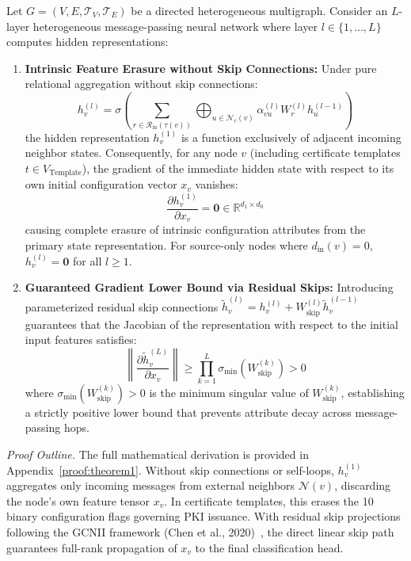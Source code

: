 \begin{theorem}
\label{thm:representation_preservation}
Let $G = (V, E, \mathcal{T}_V, \mathcal{T}_E)$ be a directed heterogeneous multigraph. Consider an $L$-layer heterogeneous message-passing neural network where layer $l \in \{1, \dots, L\}$ computes hidden representations:
\begin{enumerate}
    \item \textbf{Intrinsic Feature Erasure without Skip Connections:} Under pure relational aggregation without skip connections:
    \begin{equation}
    h_v^{(l)} = \sigma \left( \sum_{r \in \mathcal{R}_{\text{in}}(\tau(v))} \bigoplus_{u \in \mathcal{N}_r(v)} \alpha_{vu}^{(l)} W_r^{(l)} h_u^{(l-1)} \right)
    \end{equation}
    the hidden representation $h_v^{(1)}$ is a function exclusively of adjacent incoming neighbor states. Consequently, for any node $v$ (including certificate templates $t \in V_{\text{Template}}$), the gradient of the immediate hidden state with respect to its own initial configuration vector $x_v$ vanishes:
    \begin{equation}
    \frac{\partial h_v^{(1)}}{\partial x_v} = \mathbf{0} \in \mathbb{R}^{d_1 \times d_0}
    \end{equation}
    causing complete erasure of intrinsic configuration attributes from the primary state representation. For source-only nodes where $d_{\text{in}}(v) = 0$, $h_v^{(l)} = \mathbf{0}$ for all $l \ge 1$.
    \item \textbf{Guaranteed Gradient Lower Bound via Residual Skips:} Introducing parameterized residual skip connections $\tilde{h}_v^{(l)} = h_v^{(l)} + W_{\text{skip}}^{(l)} \tilde{h}_v^{(l-1)}$ guarantees that the Jacobian of the representation with respect to the initial input features satisfies:
    \begin{equation}
    \left\| \frac{\partial \tilde{h}_v^{(L)}}{\partial x_v} \right\| \ge \prod_{k=1}^L \sigma_{\min}(W_{\text{skip}}^{(k)}) > 0
    \end{equation}
    where $\sigma_{\min}(W_{\text{skip}}^{(k)}) > 0$ is the minimum singular value of $W_{\text{skip}}^{(k)}$, establishing a strictly positive lower bound that prevents attribute decay across message-passing hops.
\end{enumerate}
\end{theorem}

\noindent\textit{Proof Outline.} The full mathematical derivation is provided in Appendix~\ref{proof:theorem1}. Without skip connections or self-loops, $h_v^{(1)}$ aggregates only incoming messages from external neighbors $\mathcal{N}(v)$, discarding the node's own feature tensor $x_v$. In certificate templates, this erases the 10 binary configuration flags governing PKI issuance. With residual skip projections following the GCNII framework (Chen et al., 2020)~\cite{chen2020simple}, the direct linear skip path guarantees full-rank propagation of $x_v$ to the final classification head.

